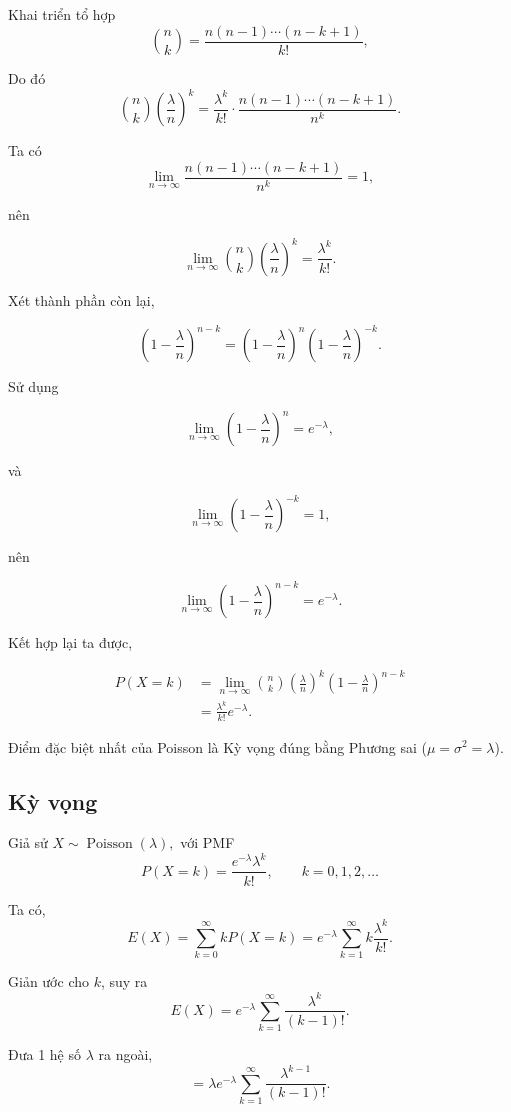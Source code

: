 Khai triển tổ hợp
\[
\binom{n}{k}
=
\frac{n(n-1)\cdots(n-k+1)}{k!},
\]

Do đó
\[
\binom{n}{k}
\left(\frac{\lambda}{n}\right)^k
=
\frac{\lambda^k}{k!}
\cdot
\frac{n(n-1)\cdots(n-k+1)}{n^k}.
\]

Ta có
\[
\lim_{n\to\infty}
\frac{n(n-1)\cdots(n-k+1)}{n^k}
=
1,
\]

nên

\[
\lim_{n\to\infty}
\binom{n}{k}
\left(\frac{\lambda}{n}\right)^k
=
\frac{\lambda^k}{k!}.
\]

Xét thành phần còn lại,

\[
\left(1-\frac{\lambda}{n}\right)^{n-k}
=
\left(1-\frac{\lambda}{n}\right)^n
\left(1-\frac{\lambda}{n}\right)^{-k}.
\]

Sử dụng

\[
\lim_{n\to\infty}
\left(1-\frac{\lambda}{n}\right)^n
=
e^{-\lambda},
\]

và

\[
\lim_{n\to\infty}
\left(1-\frac{\lambda}{n}\right)^{-k}
=
1,
\]

nên

\[
\lim_{n\to\infty}
\left(1-\frac{\lambda}{n}\right)^{n-k}
=
e^{-\lambda}.
\]

Kết hợp lại ta được,

\[
\begin{aligned}
P(X=k)
&=
\lim_{n\to\infty}
\binom{n}{k}
\left(\frac{\lambda}{n}\right)^k
\left(1-\frac{\lambda}{n}\right)^{n-k}
\\
&=
\frac{\lambda^k}{k!}
e^{-\lambda}.
\end{aligned}
\]

Điểm đặc biệt nhất của Poisson là Kỳ vọng đúng bằng Phương sai ($\mu = \sigma^2 = \lambda$).

\subsection*{Kỳ vọng}
Giả sử $X\sim\operatorname{Poisson}(\lambda),$ với PMF
\[
P(X=k)
=
\frac{e^{-\lambda}\lambda^k}{k!},
\qquad
k=0,1,2,\ldots
\]

Ta có,
\[
E(X)
=
\sum_{k=0}^{\infty}
kP(X=k)
=
e^{-\lambda}
\sum_{k=1}^{\infty}
k
\frac{\lambda^k}{k!}.
\]

Giản ước cho $k$, suy ra
\[
E(X)
=
e^{-\lambda}
\sum_{k=1}^{\infty}
\frac{\lambda^k}{(k-1)!}.
\]

Đưa 1 hệ số \(\lambda\) ra ngoài,
\[
=
\lambda
e^{-\lambda}
\sum_{k=1}^{\infty}
\frac{\lambda^{k-1}}{(k-1)!}.
\]

